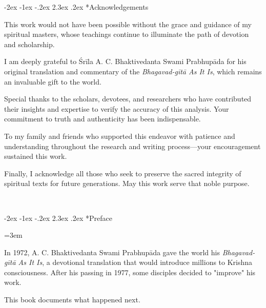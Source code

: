 \documentclass[12pt,twoside]{book}
\makeatletter
\renewcommand\section{\@startsection{section}{1}{\z@}%
{-3.5ex \@plus -1ex \@minus -.2ex}%
{2.3ex \@plus.2ex}%
{\normalfont\Large\bfseries}}
\let\oldsection\section
\renewcommand{\section}[1]{\needspace{4\baselineskip}\oldsection{#1}}
\renewcommand\section{\@startsection{section}{1}{\z@}%
{-2ex \@plus -1ex \@minus -.2ex}%
{2.3ex \@plus.2ex}%
{\normalfont\Large\bfseries}}
\makeatother
\begin{document}
\setcounter{page}{1}
\vspace*{0.15\textheight}
\section*{Acknowledgements}
\thispagestyle{sectionopening}

\normalfont\justifying
This work would not have been possible without the grace and guidance of my spiritual masters, whose teachings continue to illuminate the path of devotion and scholarship.

I am deeply grateful to Śrīla A. C. Bhaktivedanta Swami Prabhupāda for his original translation and commentary of the \emph{Bhagavad-gītā As It Is}, which remains an invaluable gift to the world.

Special thanks to the scholars, devotees, and researchers who have contributed their insights and expertise to verify the accuracy of this analysis. Your commitment to truth and authenticity has been indispensable.

To my family and friends who supported this endeavor with patience and understanding throughout the research and writing process—your encouragement sustained this work.

Finally, I acknowledge all those who seek to preserve the sacred integrity of spiritual texts for future generations. May this work serve that noble purpose.

\clearpage

\thispagestyle{empty}
~
\clearpage

\pagestyle{fancy}

\vspace*{0.15\textheight}
\section*{Preface}
\thispagestyle{sectionopening}
\setlength{\parskip}{3pt plus 1pt minus 1pt}
\emergencystretch=3em

\normalfont\justifying
In 1972, A. C. Bhaktivedanta Swami Prabhupāda gave the world his \emph{Bhagavad-gītā As It Is}, a devotional translation that would introduce millions to Krishna consciousness. After his passing in 1977, some disciples decided to "improve" his work.

This book documents what happened next.
\end{document}
